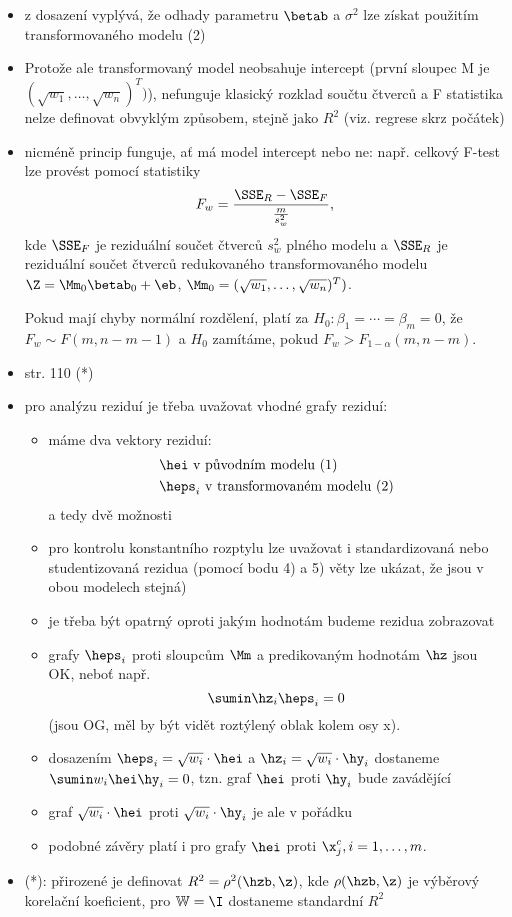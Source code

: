 \begin{itemize}
	\item z dosazení vyplývá, že odhady parametru $\betab$ a $\sigma^2$ lze získat použitím transformovaného modelu (2)
	\item Protože ale transformovaný model neobsahuje intercept (první sloupec M je $(\sqrt{w_1}, \dots, \sqrt{w_n})^T)$), nefunguje klasický rozklad součtu čtverců a F statistika nelze definovat obvyklým způsobem, stejně jako $R^2$ (viz. regrese skrz počátek)
	\item nicméně princip  funguje, ať má model intercept nebo ne:
	např. celkový F-test lze provést pomocí statistiky
	$$
	F_w = \frac{\SSE_R - \SSE_F}{\frac{m}{s_w^2}},
	$$
	kde $\SSE_F$ je reziduální součet čtverců $s_w^2$ plného modelu a $\SSE_R$ je reziduální součet čtverců redukovaného transformovaného modelu $\Z = \Mm_0 \betab_0 + \eb$, $\Mm_0 = (\sqrt{w_1}, \dots, \sqrt{w_n})^T)$.
	
	Pokud mají chyby normální rozdělení, platí za $H_0: \beta_1 = \cdots = \beta_m = 0$, že $F_w \sim F(m, n-m-1)$ a $H_0$ zamítáme, pokud $F_w > F_{1-\alpha}(m,n-m)$.
	\item str. 110 (*)
	\item pro analýzu reziduí je třeba uvažovat vhodné grafy reziduí:
	\begin{itemize}
		\item máme dva vektory reziduí:
		\begin{align*}
			& \hei \text{ v původním modelu (1)} \\
			& \heps_i \text{ v transformovaném modelu (2)}
		\end{align*}
		a tedy dvě možnosti
		\item pro kontrolu konstantního rozptylu lze uvažovat i standardizovaná nebo studentizovaná rezidua (pomocí bodu 4) a 5) věty lze ukázat, že jsou v obou modelech stejná)
		\item je třeba být opatrný oproti jakým hodnotám budeme rezidua zobrazovat
		\item grafy $\heps_i$ proti sloupcům $\Mm$ a predikovaným hodnotám $\hz$ jsou OK, neboť např.
		$$
		\sumin \hz_i \heps_i = 0
		$$
		(jsou OG, měl by být vidět roztýlený oblak kolem osy x).
		\item dosazením $\heps_i = \sqrt{w_i}  \cdot \hei$ a $\hz_i = \sqrt{w_i} \cdot \hy_i$ dostaneme $\sumin w_i \hei \hy_i = 0$, tzn. graf $\hei$ proti $\hy_i$ bude zavádějící
		\item graf $\sqrt{w_i}  \cdot \hei$ proti $\sqrt{w_i}  \cdot \hy_i$ je ale v pořádku
		\item podobné závěry platí i pro grafy $\hei$ proti $\x_j^c, i = 1, \dots, m$.
 	\end{itemize}
 	\item (*): přirozené je definovat $R^2 = \rho^2(\hzb, \z)$, kde $\rho(\hzb, \z)$ je výběrový korelační koeficient, pro $\mathbb{W} = \I$ dostaneme standardní $R^2$
\end{itemize}

